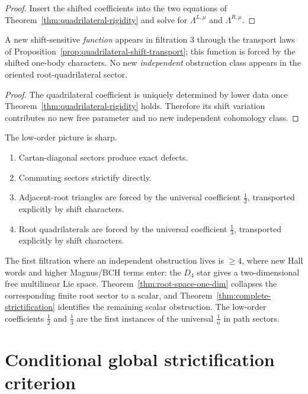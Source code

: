 \begin{proof}
Insert the shifted coefficients into the two equations of
Theorem~\ref{thm:quadrilateral-rigidity} and solve for
$\Lambda^{L,\mu}$ and $\Lambda^{R,\mu}$.
\end{proof}

\begin{corollary}
\label{cor:no-new-filtration3-shift-obstruction}
A new shift-sensitive \emph{function} appears in filtration $3$ through
the transport laws of
Proposition~\ref{prop:quadrilateral-shift-transport}; this function is
forced by the shifted one-body characters. No new \emph{independent}
obstruction class appears in the oriented root-quadrilateral sector.
\end{corollary}

\begin{proof}
The quadrilateral coefficient is uniquely determined by lower data once
Theorem~\ref{thm:quadrilateral-rigidity} holds. Therefore its shift
variation contributes no new free parameter and no new independent
cohomology class.
\end{proof}

\begin{remark}
The low-order picture is sharp.
\begin{enumerate}
\item Cartan-diagonal sectors produce exact defects.
\item Commuting sectors strictify directly.
\item Adjacent-root triangles are forced by the universal coefficient
 $\frac12$, transported explicitly by shift characters.
\item Root quadrilaterals are forced by the universal coefficient
 $\frac13$, transported explicitly by shift characters.
\end{enumerate}
The first filtration where an independent obstruction lives is
$\ge 4$, where new Hall words and higher Magnus/BCH terms enter: the
$D_4$ star gives a two-dimensional free multilinear Lie space.
Theorem~\ref{thm:root-space-one-dim} collapses the corresponding finite
root sector to a scalar, and Theorem~\ref{thm:complete-strictification}
identifies the remaining scalar obstruction. The low-order coefficients
$\frac12$ and $\frac13$ are the first instances of the universal
$\frac1n$ in path sectors.
\end{remark}

\section{Conditional global strictification criterion}

